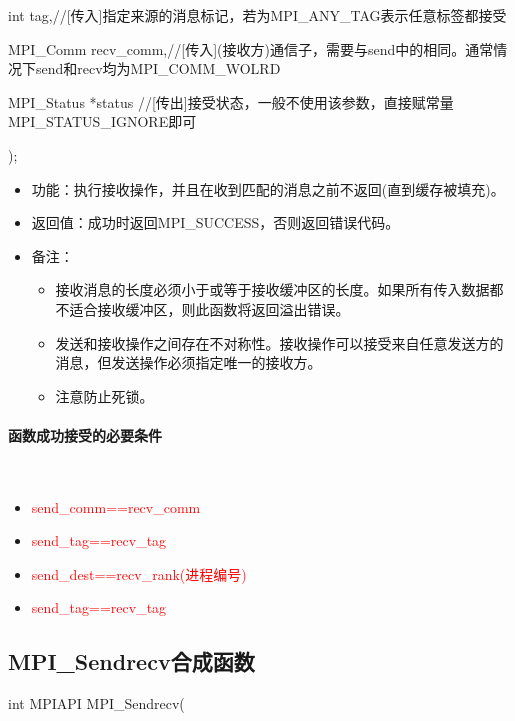 \documentclass[UTF8]{article}%
\begin{document}
    \qquad int             tag,//[传入]指定来源的消息标记，若为MPI\_ANY\_TAG表示任意标签都接受

    \qquad MPI\_Comm       recv\_comm,//[传入](接收方)通信子，需要与send中的相同。通常情况下send和recv均为MPI\_COMM\_WOLRD

    \qquad MPI\_Status      *status //[传出]接受状态，一般不使用该参数，直接赋常量MPI\_STATUS\_IGNORE即可

);

\begin{itemize}
    \item 功能：执行接收操作，并且在收到匹配的消息之前不返回(直到缓存被填充)。
    \item 返回值：成功时返回MPI\_SUCCESS，否则返回错误代码。
    \item 备注：
    
    {
        \begin{itemize}
            \item 接收消息的长度必须小于或等于接收缓冲区的长度。如果所有传入数据都不适合接收缓冲区，则此函数将返回溢出错误。
            \item 发送和接收操作之间存在不对称性。接收操作可以接受来自任意发送方的消息，但发送操作必须指定唯一的接收方。
            \item 注意防止死锁。
        \end{itemize}
    }

\end{itemize}

\paragraph{函数成功接受的必要条件}~{}

\begin{itemize}
    \item \textcolor{red}{send\_comm==recv\_comm}
    \item \textcolor{red}{send\_tag==recv\_tag}
    \item \textcolor{red}{send\_dest==recv\_rank(进程编号)}
    \item \textcolor{red}{send\_tag==recv\_tag}
\end{itemize}

\subsection{MPI\_Sendrecv合成函数}

int MPIAPI MPI\_Sendrecv(
  
\end{document}
